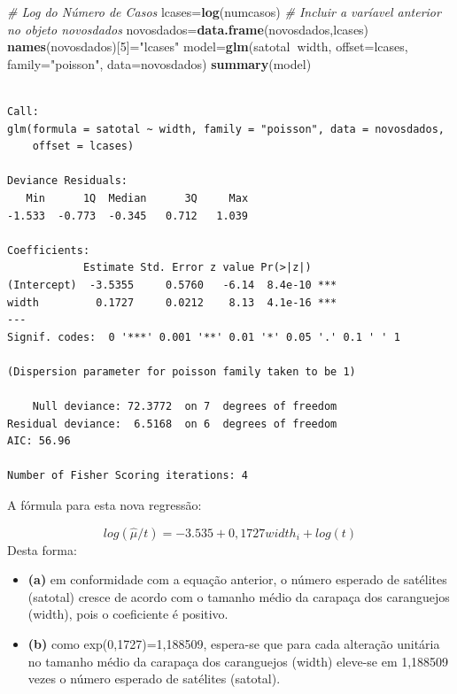 \documentclass[12pt,brazil,oneside]{book}
\newenvironment{Shaded}{\begin{snugshade}}{\end{snugshade}}
\newcommand{\CommentTok}[1]{\textcolor[rgb]{0.56,0.35,0.01}{\textit{#1}}}
\newcommand{\DataTypeTok}[1]{\textcolor[rgb]{0.13,0.29,0.53}{#1}}
\newcommand{\DecValTok}[1]{\textcolor[rgb]{0.00,0.00,0.81}{#1}}
\newcommand{\KeywordTok}[1]{\textcolor[rgb]{0.13,0.29,0.53}{\textbf{#1}}}
\newcommand{\NormalTok}[1]{#1}
\newcommand{\OperatorTok}[1]{\textcolor[rgb]{0.81,0.36,0.00}{\textbf{#1}}}
\newcommand{\StringTok}[1]{\textcolor[rgb]{0.31,0.60,0.02}{#1}}
\providecommand{\tightlist}{%
  \setlength{\itemsep}{0pt}\setlength{\parskip}{0pt}}
\begin{document}
\begin{Shaded}
\begin{Highlighting}[]
\CommentTok{# Log do Número de Casos}
\NormalTok{lcases=}\KeywordTok{log}\NormalTok{(numcasos) }
\CommentTok{# Incluir a varíavel anterior no objeto novosdados}
\NormalTok{novosdados=}\KeywordTok{data.frame}\NormalTok{(novosdados,lcases) }
\KeywordTok{names}\NormalTok{(novosdados)[}\DecValTok{5}\NormalTok{]=}\StringTok{"lcases"}
\NormalTok{model=}\KeywordTok{glm}\NormalTok{(satotal}\OperatorTok{~}\NormalTok{width, }\DataTypeTok{offset=}\NormalTok{lcases, }\DataTypeTok{family=}\StringTok{"poisson"}\NormalTok{, }\DataTypeTok{data=}\NormalTok{novosdados)}
\KeywordTok{summary}\NormalTok{(model)}
\end{Highlighting}
\end{Shaded}

\begin{verbatim}

Call:
glm(formula = satotal ~ width, family = "poisson", data = novosdados, 
    offset = lcases)

Deviance Residuals: 
   Min      1Q  Median      3Q     Max  
-1.533  -0.773  -0.345   0.712   1.039  

Coefficients:
            Estimate Std. Error z value Pr(>|z|)    
(Intercept)  -3.5355     0.5760   -6.14  8.4e-10 ***
width         0.1727     0.0212    8.13  4.1e-16 ***
---
Signif. codes:  0 '***' 0.001 '**' 0.01 '*' 0.05 '.' 0.1 ' ' 1

(Dispersion parameter for poisson family taken to be 1)

    Null deviance: 72.3772  on 7  degrees of freedom
Residual deviance:  6.5168  on 6  degrees of freedom
AIC: 56.96

Number of Fisher Scoring iterations: 4
\end{verbatim}

A fórmula para esta nova regressão:

\[
log(\hat\mu/t)=-3.535 + 0,1727 width_i + log(t)
\] Desta forma:

\begin{itemize}
\tightlist
\item
  \textbf{(a)} em conformidade com a equação anterior, o número esperado
  de satélites (satotal) cresce de acordo com o tamanho médio da
  carapaça dos caranguejos (width), pois o coeficiente é positivo.
\item
  \textbf{(b)} como exp(0,1727)=1,188509, espera-se que para cada
  alteração unitária no tamanho médio da carapaça dos caranguejos
  (width) eleve-se em 1,188509 vezes o número esperado de satélites
  (satotal).
\end{itemize}
\end{document}
